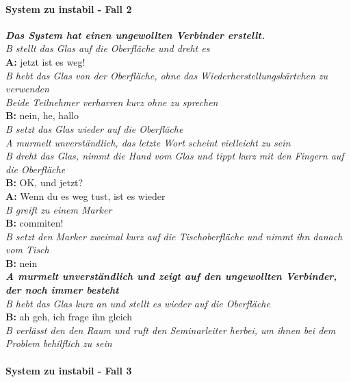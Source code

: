 \paragraph{System zu instabil - Fall 2}

\begin{transkript}
\emph{\textbf{Das System hat einen ungewollten Verbinder erstellt.}} \\
\emph{B stellt das Glas auf die Oberfläche und dreht es} \\
\textbf{A:} jetzt ist es weg! \\
\emph{B hebt das Glas von der Oberfläche, ohne das Wiederherstellungskärtchen zu verwenden} \\
\emph{Beide Teilnehmer verharren kurz ohne zu sprechen} \\
\textbf{B:} nein, he, hallo \\
\emph{B setzt das Glas wieder auf die Oberfläche} \\
\emph{A murmelt unverständlich, das letzte Wort scheint vielleicht zu sein} \\
\emph{B dreht das Glas, nimmt die Hand vom Glas und tippt kurz mit den Fingern auf die Oberfläche} \\
\textbf{B:} OK, und jetzt? \\
\textbf{A:} Wenn du es weg tust, ist es wieder \\
\emph{B greift zu einem Marker} \\
\textbf{B:} commiten! \\
\emph{B setzt den Marker zweimal kurz auf die Tischoberfläche und nimmt ihn danach vom Tisch} \\
\textbf{B:} nein \\
\emph{\textbf{A murmelt unverständlich und zeigt auf den ungewollten Verbinder, der noch immer besteht}} \\
\emph{B hebt das Glas kurz an und stellt es wieder auf die Oberfläche} \\
\textbf{B:} ah geh, ich frage ihn gleich \\
\emph{B verlässt den den Raum und ruft den Seminarleiter herbei, um ihnen bei dem Problem behilflich zu sein} \\
\end{transkript}

\paragraph{System zu instabil - Fall 3}


